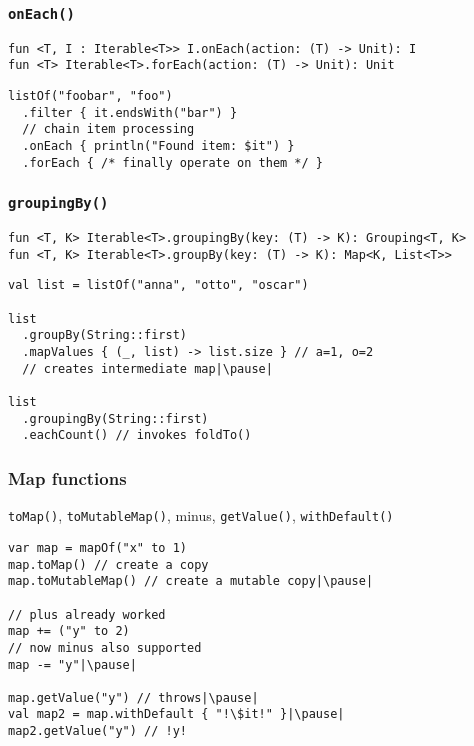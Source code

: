 \begin{frame}[fragile] \frametitle{\texttt{onEach()}}
\footnotesize{\texttt{fun <T, I : Iterable<T>> I.onEach(action: (T) -> Unit): I}} \\
\footnotesize{\texttt{fun <T> Iterable<T>.forEach(action: (T) -> Unit): Unit}}\pause
\normalsize{}
\begin{lstlisting}
listOf("foobar", "foo")
  .filter { it.endsWith("bar") }
  // chain item processing
  .onEach { println("Found item: $it") }
  .forEach { /* finally operate on them */ }
\end{lstlisting}
\end{frame}

\begin{frame}[fragile] \frametitle{\texttt{groupingBy()}}
\footnotesize{\texttt{fun <T, K> Iterable<T>.groupingBy(key: (T) -> K): Grouping<T, K>}} \\
\footnotesize{\texttt{fun <T, K> Iterable<T>.groupBy(key: (T) -> K): Map<K, List<T>>}}\pause
\begin{lstlisting}
val list = listOf("anna", "otto", "oscar")

list
  .groupBy(String::first)
  .mapValues { (_, list) -> list.size } // a=1, o=2
  // creates intermediate map|\pause|

list
  .groupingBy(String::first)
  .eachCount() // invokes foldTo()
\end{lstlisting}
\end{frame}

\begin{frame}[fragile] \frametitle{Map functions}
\texttt{toMap()}, \texttt{toMutableMap()}, minus, \texttt{getValue()}, \texttt{withDefault()}
\begin{lstlisting}
var map = mapOf("x" to 1)
map.toMap() // create a copy
map.toMutableMap() // create a mutable copy|\pause|

// plus already worked
map += ("y" to 2)
// now minus also supported
map -= "y"|\pause|

map.getValue("y") // throws|\pause|
val map2 = map.withDefault { "!\$it!" }|\pause|
map2.getValue("y") // !y!
\end{lstlisting}
\end{frame}

